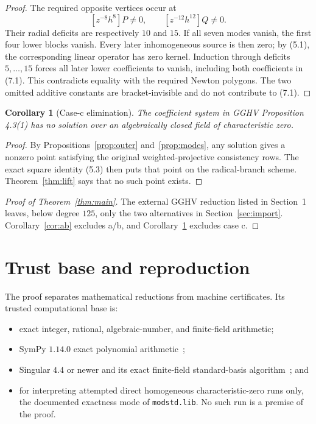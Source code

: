 \documentclass[11pt]{article}
\newtheorem{corollary}[theorem]{Corollary}
\theoremstyle{definition}
\theoremstyle{remark}
\begin{document}
\begin{proof}
The required opposite vertices occur at
\[
 [z^{-8}h^8]P\ne0,\qquad[z^{-12}h^{12}]Q\ne0.           \tag{7.1}
\]
Their radial deficits are respectively \(10\) and \(15\).  If all seven
modes vanish, the first four lower blocks vanish.  Every later
inhomogeneous source is then zero; by (5.1), the corresponding linear
operator has zero kernel.  Induction through deficits \(5,\ldots,15\)
forces all later lower coefficients to vanish, including both
coefficients in (7.1).  This contradicts equality with the required
Newton polygons.  The two omitted additive constants are
bracket-invisible and do not contribute to (7.1).
\end{proof}

\begin{corollary}[Case-c elimination]\label{cor:casec}
The coefficient system in GGHV Proposition 4.3(1) has no solution over
an algebraically closed field of characteristic zero.
\end{corollary}

\begin{proof}
By Propositions~\ref{prop:outer} and~\ref{prop:modes}, any solution gives
a nonzero point satisfying the original weighted-projective consistency
rows.  The exact square identity (5.3) then puts that point on the
radical-branch scheme.  Theorem~\ref{thm:lift} says that no such point
exists.
\end{proof}

\begin{proof}[Proof of Theorem~\ref{thm:main}]
The external GGHV reduction listed in Section~1 leaves, below degree
\(125\), only the two alternatives in Section~\ref{sec:import}.
Corollary~\ref{cor:ab} excludes a/b, and
Corollary~\ref{cor:casec} excludes case c.
\end{proof}

\section{Trust base and reproduction}\label{sec:reproduce}

The proof separates mathematical reductions from machine certificates.
Its trusted computational base is:

\begin{itemize}
\item exact integer, rational, algebraic-number, and finite-field
  arithmetic;
\item SymPy \(1.14.0\) exact polynomial arithmetic~\cite{SymPy};
\item Singular \(4.4\) or newer and its exact finite-field
  standard-basis algorithm~\cite{Singular}; and
\item for interpreting attempted direct homogeneous
  characteristic-zero runs only, the documented exactness mode of
  \texttt{modstd.lib}.  No such run is a premise of the proof.
\end{itemize}
\end{document}
